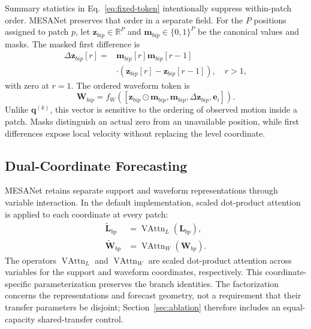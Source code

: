 Summary statistics in Eq.~\eqref{eq:fixed-token} intentionally suppress
within-patch order. MESANet preserves that order in a separate field. For the
$P$ positions assigned to patch $p$, let $\mathbf z_{bip}\in\mathbb R^P$ and
$\mathbf m_{bip}\in\{0,1\}^{P}$ be the canonical values and masks. The masked
first difference is
\begin{equation}
\begin{aligned}
\Delta\mathbf z_{bip}[r] ={}&
\mathbf m_{bip}[r]\mathbf m_{bip}[r-1] \\
&\cdot(\mathbf z_{bip}[r]-\mathbf z_{bip}[r-1]),\quad r>1,
\end{aligned}
\label{eq:wave-diff}
\end{equation}
with zero at $r=1$. The ordered waveform token is
\begin{equation}
\mathbf W_{bip}=f_W\!\left(
[\mathbf z_{bip}\odot\mathbf m_{bip},\mathbf m_{bip},
\Delta\mathbf z_{bip},\mathbf e_i]\right).
\label{eq:wave-token}
\end{equation}
Unlike $\mathbf q^{(k)}$, this vector is sensitive to the ordering of observed
motion inside a patch. Masks distinguish an actual zero from an unavailable
position, while first differences expose local velocity without replacing the
level coordinate.

\subsection{Dual-Coordinate Forecasting}

MESANet retains separate support and waveform representations through variable
interaction. In the default implementation, scaled dot-product attention is
applied to each coordinate at every patch:
\begin{align}
\widetilde{\mathbf L}_{bp} &=
\operatorname{VAttn}_L(\mathbf L_{bp}), \label{eq:level-transfer}\\
\widetilde{\mathbf W}_{bp} &=
\operatorname{VAttn}_W(\mathbf W_{bp}). \label{eq:wave-transfer}
\end{align}
The operators $\operatorname{VAttn}_L$ and $\operatorname{VAttn}_W$ are
scaled dot-product attention across variables for the support and waveform
coordinates, respectively.
This coordinate-specific parameterization preserves the branch identities.
The factorization concerns the representations and forecast geometry, not a
requirement that their transfer parameters be disjoint; Section~\ref{sec:ablation}
therefore includes an equal-capacity shared-transfer control.


